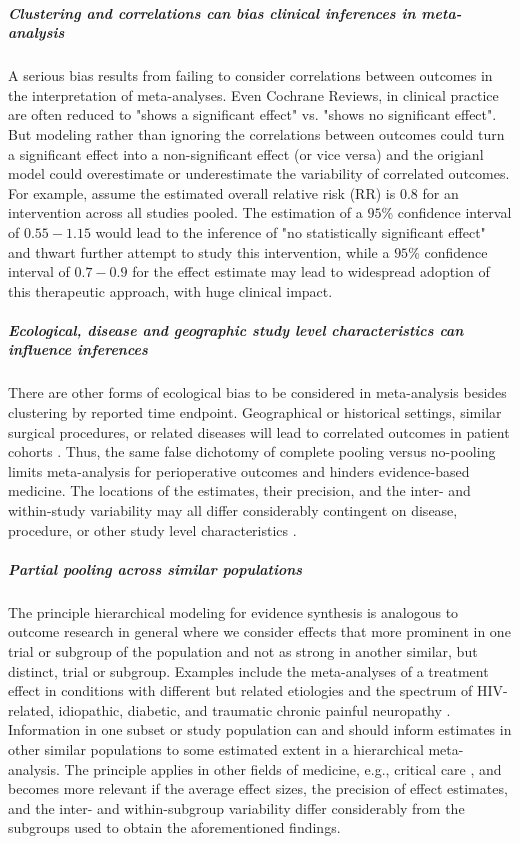 \documentclass[11pt,notitlepage]{article}
\begin{document}
\subparagraph*{Clustering and correlations can bias clinical inferences in meta-analysis }
A serious bias results from failing to consider correlations 
between outcomes in the interpretation of meta-analyses. Even Cochrane Reviews, in clinical practice 
are often reduced to "shows a significant effect" vs. "shows no significant effect". But modeling rather than
ignoring the correlations between outcomes could turn a significant effect into a non-significant effect 
(or vice versa) and the origianl model could overestimate or underestimate the variability of correlated outcomes. 
For example, assume the estimated overall relative risk (RR) is $0.8$ for an 
intervention across all studies pooled. The estimation of a $95$\% confidence 
interval of $0.55-1.15$ would lead to the inference of "no statistically 
significant effect" and thwart further attempt to study this intervention, 
while a $95$\% confidence interval of $0.7-0.9$ for the effect estimate may 
lead to widespread adoption of this therapeutic approach, with huge clinical impact.

\subparagraph*{Ecological, disease and geographic study level characteristics can influence inferences}
There are other forms of ecological bias to be considered in meta-analysis besides clustering by reported time endpoint. Geographical or 
historical settings, similar surgical procedures, or related diseases will lead to correlated outcomes in patient cohorts 
\cite{Abroug2011,Andreae2013,Andreae2015,Roth2015CriticalCare}. 
Thus, the same false dichotomy of complete pooling versus no-pooling limits meta-analysis for perioperative outcomes and hinders evidence-based 
medicine. The locations of the estimates, their precision, and the inter- and within-study variability may all differ considerably 
contingent on disease, procedure, or other study level characteristics \cite{Andreae2013,Andreae2015,Roth2015CriticalCare}.

\subparagraph*{Partial pooling across similar populations}
The principle hierarchical modeling for evidence synthesis is analogous to outcome research in general where we 
consider effects that more prominent in one trial or subgroup of the population and not as strong in another similar, but 
distinct, trial or subgroup. Examples include the meta-analyses of a treatment effect in conditions with different but 
related etiologies and the spectrum of HIV-related, idiopathic, diabetic, and traumatic chronic painful neuropathy 
\cite{Andreae2015}. Information in one subset or study population can and should inform estimates in other similar populations 
to some estimated extent in a hierarchical meta-analysis. The principle applies in other fields of medicine, e.g., critical care
\cite{Roth2015CriticalCare}, and becomes more relevant if the average effect sizes, the precision of effect 
estimates, and the inter- and within-subgroup variability differ considerably from the subgroups used to obtain 
the aforementioned findings.
\end{document}

